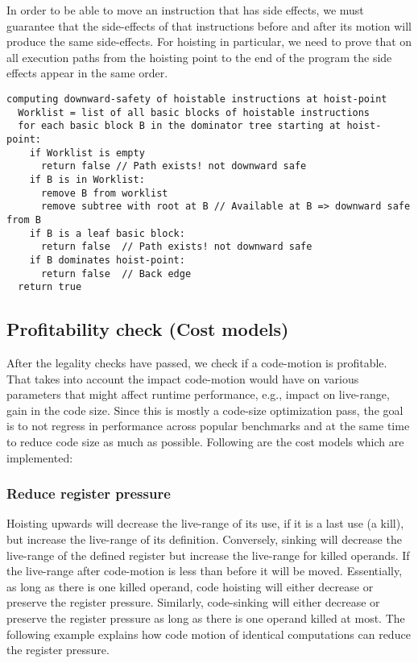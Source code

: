 \documentclass[acmlarge,review,anonymous]{acmart}\settopmatter{printfolios=true}
\begin{document}
In order to be able to move an instruction that has side effects, we must
guarantee that the side-effects of that instructions before and after its motion
will produce the same side-effects.  For hoisting in particular, we need to
prove that on all execution paths from the hoisting point to the end of the
program the side effects appear in the same order.

\begin{verbatim}
computing downward-safety of hoistable instructions at hoist-point
  Worklist = list of all basic blocks of hoistable instructions
  for each basic block B in the dominator tree starting at hoist-point:
    if Worklist is empty
      return false // Path exists! not downward safe
    if B is in Worklist:
      remove B from worklist
      remove subtree with root at B // Available at B => downward safe from B
    if B is a leaf basic block:
      return false  // Path exists! not downward safe
    if B dominates hoist-point:
      return false  // Back edge
  return true
\end{verbatim}


\subsection{Profitability check (Cost models)}
\label{sec:cost-models}
After the legality checks have passed, we check if a code-motion is profitable.
That takes into account the impact code-motion would have on various parameters
that might affect runtime performance, e.g., impact on live-range, gain in the
code size. Since this is mostly a code-size optimization pass, the goal is to
not regress in performance across popular benchmarks and at the same time to reduce
code size as much as possible. Following are the cost models which are
implemented:

\subsubsection{Reduce register pressure}
\label{hoist:reg-pressure}
Hoisting upwards will decrease the live-range of its use, if it is a last use (a
kill), but increase the live-range of its definition. Conversely, sinking will
decrease the live-range of the defined register but increase the live-range for
killed operands. If the live-range after code-motion is less than before it will
be moved. Essentially, as long as there is one killed operand, code hoisting
will either decrease or preserve the register pressure.  Similarly, code-sinking
will either decrease or preserve the register pressure as long as there is one
operand killed at most.  The following example explains how code motion of
identical computations can reduce the register pressure.
\end{document}
